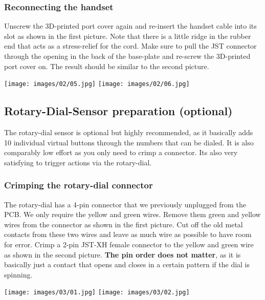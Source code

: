 \documentclass[]{article}
\begin{document}
\subsubsection{Reconnecting the handset}
\begin{minipage}[t]{0.4\linewidth}
	\vspace{0pt}
	Unscrew the 3D-printed port cover again and re-insert the handset cable into its slot as shown in the first picture. Note that there is a little ridge in the rubber end that acts as a stress-relief for the cord.
	\newline
	\newline
	Make sure to pull the JST connector through the opening in the back of the base-plate and re-screw the 3D-printed port cover on. The result should be similar to the second picture.
\end{minipage}
\hfill
\begin{minipage}[t]{0.5\linewidth}
	\vspace{0pt}
	\texttt{[image: images/02/05.jpg]}
	\texttt{[image: images/02/06.jpg]}
\end{minipage}






\subsection{Rotary-Dial-Sensor preparation (optional)}
The rotary-dial sensor is optional but highly recommended, as it basically adds 10 individual virtual buttons through the numbers that can be dialed. It is also comparably low effort as you only need to crimp a connector. Its also very satisfying to trigger actions via the rotary-dial.
\subsubsection{Crimping the rotary-dial connector}
\begin{minipage}[t]{0.4\linewidth}
	\vspace{0pt}
	The rotary-dial has a 4-pin connector that we previously unplugged from the PCB. We only require the yellow and green wires. 
	\newline
	\newline
	Remove them green and yellow wires from the connector as shown in the first picture. Cut off the old metal contacts from these two wires and leave as much wire as possible to have room for error. Crimp a 2-pin JST-XH female connector to the yellow and green wire as shown in the second picture. \textbf{The pin order does not matter}, as it is basically just a contact that opens and closes in a certain pattern if the dial is spinning.
\end{minipage}
\hfill
\begin{minipage}[t]{0.5\linewidth}
	\vspace{0pt}
	\texttt{[image: images/03/01.jpg]}
	\texttt{[image: images/03/02.jpg]}
\end{minipage}
\end{document}
